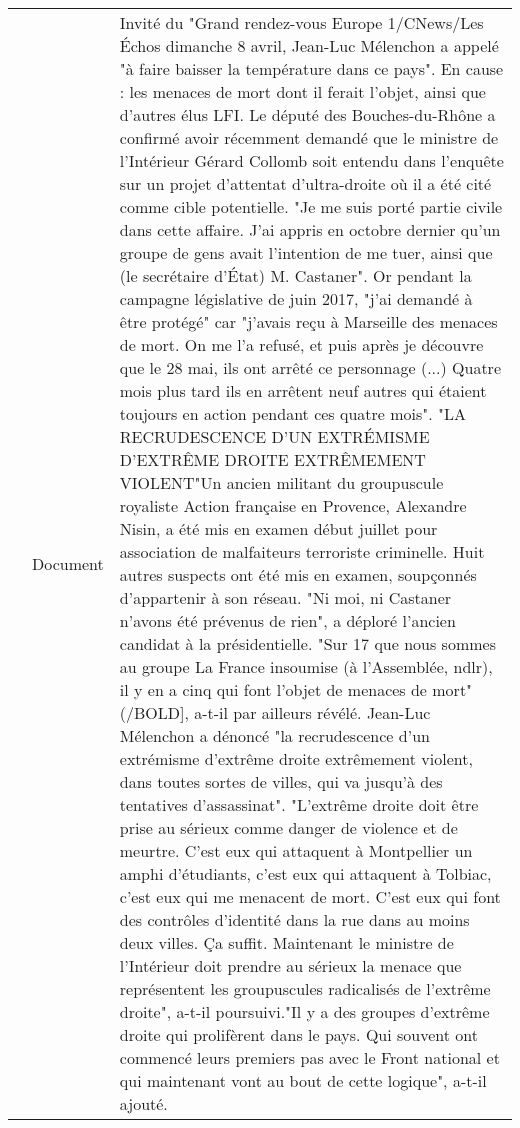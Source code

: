 \documentclass[11pt,a4paper]{article}
\begin{document}
 
\begin{table*} 
 \centering 
 \begin{tabular}{|cr|L|} 
 \hline 
 & Document &\baselineskip=8pt {\small Invité du "Grand rendez-vous Europe 1/CNews/Les Échos dimanche 8 avril, Jean-Luc Mélenchon a appelé "à faire baisser la température dans ce pays". En cause : les menaces de mort dont il ferait l'objet, ainsi que d'autres élus LFI. Le député des Bouches-du-Rhône a confirmé avoir récemment demandé que le ministre de l'Intérieur Gérard Collomb soit entendu dans l'enquête sur un projet d'attentat d'ultra-droite où il a été cité comme cible potentielle. "Je me suis porté partie civile dans cette affaire. J'ai appris en octobre dernier qu'un groupe de gens avait l'intention de me tuer, ainsi que (le secrétaire d'État) M. Castaner". Or pendant la campagne législative de juin 2017, "j'ai demandé à être protégé" car "j'avais reçu à Marseille des menaces de mort. On me l'a refusé, et puis après je découvre que le 28 mai, ils ont arrêté ce personnage (...) Quatre mois plus tard ils en arrêtent neuf autres qui étaient toujours en action pendant ces quatre mois". "LA RECRUDESCENCE D'UN EXTRÉMISME D'EXTRÊME DROITE EXTRÊMEMENT VIOLENT"Un ancien militant du groupuscule royaliste Action française en Provence, Alexandre Nisin, a été mis en examen début juillet pour association de malfaiteurs terroriste criminelle. Huit autres suspects ont été mis en examen, soupçonnés d'appartenir à son réseau. "Ni moi, ni Castaner n'avons été prévenus de rien", a déploré l'ancien candidat à la présidentielle. "Sur 17 que nous sommes au groupe La France insoumise (à l'Assemblée, ndlr), il y en a cinq qui font l'objet de menaces de mort"(/BOLD], a-t-il par ailleurs révélé. Jean-Luc Mélenchon a dénoncé "la recrudescence d'un extrémisme d'extrême droite extrêmement violent, dans toutes sortes de villes, qui va jusqu'à des tentatives d'assassinat". "L'extrême droite doit être prise au sérieux comme danger de violence et de meurtre. C'est eux qui attaquent à Montpellier un amphi d'étudiants, c'est eux qui attaquent à Tolbiac, c'est eux qui me menacent de mort. C'est eux qui font des contrôles d'identité dans la rue dans au moins deux villes. Ça suffit. Maintenant le ministre de l'Intérieur doit prendre au sérieux la menace que représentent les groupuscules radicalisés de l'extrême droite", a-t-il poursuivi."Il y a des groupes d'extrême droite qui prolifèrent dans le pays. Qui souvent ont commencé leurs premiers pas avec le Front national et qui maintenant vont au bout de cette logique", a-t-il ajouté.} \\ 

\end{tabular}
\end{table*}
\end{document}
